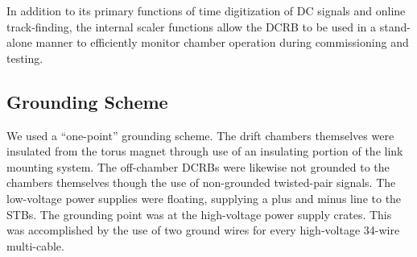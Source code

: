 In addition to its primary functions of time digitization of DC signals and online
track-finding, the internal scaler functions allow the DCRB to be used in 
a stand-alone manner to efficiently monitor chamber operation during commissioning
and testing.

\subsection{Grounding Scheme}

We used a ``one-point'' grounding scheme.  The drift chambers themselves were insulated
from the torus magnet through use of an insulating portion of the link
mounting system.  The off-chamber DCRBs were likewise not grounded
to the chambers themselves though the use of non-grounded twisted-pair signals.
The low-voltage power supplies were floating, supplying a plus and minus line 
to the STBs.
The grounding point was at the high-voltage power supply crates.  This was accomplished
by the use of two ground wires for every high-voltage 34-wire multi-cable.
